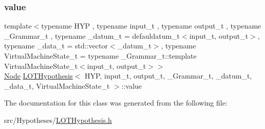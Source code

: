 \mbox{\label{class_l_o_t_hypothesis_ac759b3eab77ead1749b905a3dde74961}} 
\subsubsection{\texorpdfstring{value}{value}}
{\footnotesize\ttfamily template$<$typename H\+YP , typename input\+\_\+t , typename output\+\_\+t , typename \+\_\+\+Grammar\+\_\+t , typename \+\_\+datum\+\_\+t  = defauldatum\+\_\+t$<$input\+\_\+t, output\+\_\+t$>$, typename \+\_\+data\+\_\+t  = std\+::vector$<$\+\_\+datum\+\_\+t$>$, typename Virtual\+Machine\+State\+\_\+t  = typename \+\_\+\+Grammar\+\_\+t\+::template Virtual\+Machine\+State\+\_\+t$<$input\+\_\+t, output\+\_\+t$>$$>$ \\
\hyperlink{class_node}{Node} \hyperlink{class_l_o_t_hypothesis}{L\+O\+T\+Hypothesis}$<$ H\+YP, input\+\_\+t, output\+\_\+t, \+\_\+\+Grammar\+\_\+t, \+\_\+datum\+\_\+t, \+\_\+data\+\_\+t, Virtual\+Machine\+State\+\_\+t $>$\+::value\hspace{0.3cm}{\ttfamily [protected]}}



The documentation for this class was generated from the following file\+:\begin{DoxyCompactItemize}
\item 
src/\+Hypotheses/\hyperlink{_l_o_t_hypothesis_8h}{L\+O\+T\+Hypothesis.\+h}\end{DoxyCompactItemize}
